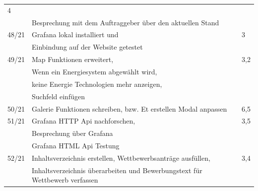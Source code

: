 \begin{table}[h]
\begin{tabular}{|l|lll|}
		4 \\&Besprechung mit dem Auftraggeber über den aktuellen Stand\\ \hline
		48/21 &
		\multicolumn{2}{l|}{Grafana lokal installiert und } &
		3 \\&Einbindung auf der Website getestet\\ \hline
		49/21 &
		\multicolumn{2}{l|}{Map Funktionen erweitert,  } &
		3,2 \\ & Wenn ein Energiesystem abgewählt wird,\\&keine Energie Technologien mehr anzeigen,\\&Suchfeld einfügen\\\hline
		50/21 &
		\multicolumn{2}{l|}{Galerie Funktionen schreiben, bzw. Et erstellen Modal anpassen} &
		6,5 \\ \hline
		51/21 &
		\multicolumn{2}{l|}{Grafana HTTP Api nachforschen,   } &
		3,5 \\ &Besprechung über Grafana\\&Grafana HTML Api Testung\\\hline
		52/21 &
		\multicolumn{2}{l|}{Inhaltsverzeichnis erstellen, Wettbewerbsanträge ausfüllen, } &
		3,4 \\&Inhaltsverzeichnis überarbeiten und Bewerbungstext für Wettbewerb verfassen\\ \hline
		
	\end{tabular}
\end{table}
\newpage
